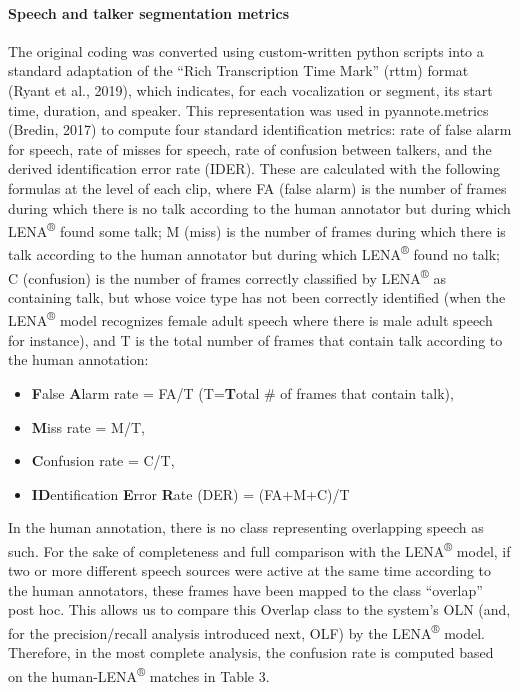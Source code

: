 \documentclass[english,table,man,floatsintext]{apa6}
\providecommand{\tightlist}{%
  \setlength{\itemsep}{0pt}\setlength{\parskip}{0pt}}
\let\oldparagraph\paragraph
\renewcommand{\paragraph}[1]{\oldparagraph{#1}\mbox{}}
\begin{document}
\paragraph{Speech and talker segmentation
metrics}\label{speech-and-talker-segmentation-metrics}

The original coding was converted using custom-written python scripts
into a standard adaptation of the \enquote{Rich Transcription Time Mark}
(rttm) format (Ryant et al., 2019), which indicates, for each
vocalization or segment, its start time, duration, and speaker. This
representation was used in pyannote.metrics (Bredin, 2017) to compute
four standard identification metrics: rate of false alarm for speech,
rate of misses for speech, rate of confusion between talkers, and the
derived identification error rate (IDER). These are calculated with the
following formulas at the level of each clip, where FA (false alarm) is
the number of frames during which there is no talk according to the
human annotator but during which LENA\textsuperscript{®} found some
talk; M (miss) is the number of frames during which there is talk
according to the human annotator but during which
LENA\textsuperscript{®} found no talk; C (confusion) is the number of
frames correctly classified by LENA\textsuperscript{®} as containing
talk, but whose voice type has not been correctly identified (when the
LENA\textsuperscript{®} model recognizes female adult speech where there
is male adult speech for instance), and T is the total number of frames
that contain talk according to the human annotation:

\begin{itemize}
\tightlist
\item
  \textbf{F}alse \textbf{A}larm rate = FA/T (T=\textbf{T}otal \# of
  frames that contain talk),
\item
  \textbf{M}iss rate = M/T,
\item
  \textbf{C}onfusion rate = C/T,
\item
  \textbf{ID}entification \textbf{E}rror \textbf{R}ate (DER) =
  (FA+M+C)/T
\end{itemize}

In the human annotation, there is no class representing overlapping
speech as such. For the sake of completeness and full comparison with
the LENA\textsuperscript{®} model, if two or more different speech
sources were active at the same time according to the human annotators,
these frames have been mapped to the class \enquote{overlap} post hoc.
This allows us to compare this Overlap class to the system's OLN (and,
for the precision/recall analysis introduced next, OLF) by the
LENA\textsuperscript{®} model. Therefore, in the most complete analysis,
the confusion rate is computed based on the
human-LENA\textsuperscript{®} matches in Table 3.
\end{document}
